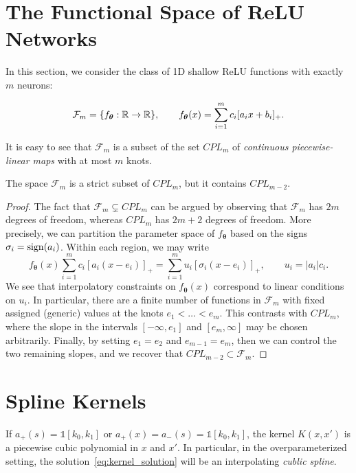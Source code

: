 \section{The Functional Space of ReLU Networks}

In this section, we consider the class of 1D shallow ReLU functions with exactly $m$ neurons:

\begin{equation}
    \mathcal F_m = \{f_{\bm \theta}: \mathbb{R}\rightarrow \mathbb{R}\},\qquad
    f_{\bm \theta}(x) = \sum_{i=1}^m c_i[a_i x + b_i]_+.
\end{equation}

It is easy to see that $\mathcal F_m$ is a subset of the set $CPL_m$ of \emph{continuous piecewise-linear maps} with at most $m$ knots. 

\begin{proposition} The space $\mathcal F_m$ is a strict subset of $CPL_m$, but it contains $CPL_{m-2}$.
\end{proposition}
\begin{proof} The fact that $\mathcal F_m \subsetneq CPL_m$ can be argued by observing that $\mathcal F_m$ has $2m$ degrees of freedom, whereas $CPL_{m}$ has $2m+2$ degrees of freedom. More precisely, we can partition the parameter space of $f_{\bm \theta}$ based on the signs $\sigma_i = {\rm sign}(a_i)$. Within each region, we may write
\begin{equation}
    f_{\bm \theta}(x)\sum_{i=1}^m c_i [a_i(x-e_i)]_+ = \sum_{i=1}^m u_i [\sigma_i (x-e_i)]_+, \qquad u_i = |a_i| c_i.
\end{equation}
We see that interpolatory constraints on $f_{\bm \theta}(x)$ correspond to linear conditions on $u_i$. In particular, there are a finite number of functions in $\mathcal F_m$ with fixed assigned (generic) values at the knots $e_1<\ldots < e_m$. This contrasts with $CPL_m$, where the slope in the intervals $[-\infty,e_1]$ and $[e_m,\infty]$ may be chosen arbitrarily. Finally, by setting $e_1 = e_2$ and $e_{m-1} = e_m$, then we can control the two remaining slopes, and we recover that $CPL_{m-2} \subset \mathcal F_m$.
\end{proof}


\section{Spline Kernels}


\begin{proposition} If $a_+(s) = \mathds 1[k_0,k_1]$ or $a_+(x) = a_-(s) = \mathds 1[k_0,k_1]$, the kernel $K(x,x')$ is a piecewise cubic polynomial in $x$ and $x'$. In particular, in the overparameterized setting, the solution~\eqref{eq:kernel_solution} will be an interpolating \emph{cublic spline}.
\end{proposition}


